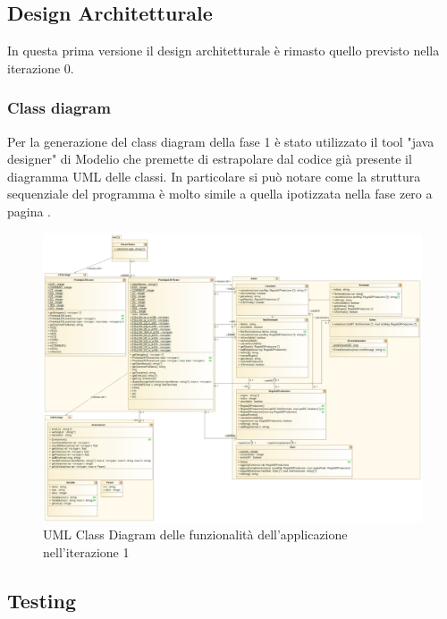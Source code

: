 \documentclass[12pt]{article}
\begin{document}
\subsection{Design Architetturale}
In questa prima versione il design architetturale è rimasto quello previsto nella iterazione 0.
\subsubsection{Class diagram}
Per la generazione del class diagram della fase 1 è stato utilizzato il tool "java designer" di Modelio che premette di estrapolare dal codice già presente il diagramma UML delle classi.
In particolare si può notare come la struttura sequenziale del programma è molto simile a quella ipotizzata nella fase zero a pagina \pageref{bozzaArc}.

\begin{figure}\label{rifUMLV1}
\centering
\includegraphics[scale=0.4]{immagini/UMLV1.png}
\caption{UML Class Diagram delle funzionalità dell'applicazione nell'iterazione 1}
\end{figure}
\pagebreak

\subsection{Testing}
\end{document}

